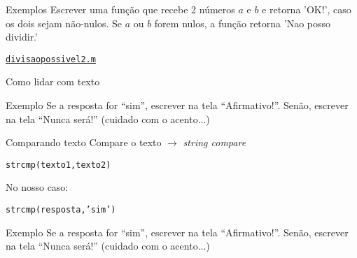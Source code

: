\documentclass[hyperref={pdfpagelabels=false}]{beamer}
\begin{document}
\begin{frame}{Exemplos}
  Escrever uma função que recebe 2 números $a$ e $b$ e retorna 'OK!', caso os dois sejam não-nulos. Se $a$ ou $b$ forem nulos, a função retorna 'Nao posso dividir.'
  \begin{center} \href{listings/divisaopossivel2.m}{\underline{\texttt{divisaopossivel2.m}}} \end{center}
\end{frame}

\begin{frame}{Como lidar com texto}
  
\end{frame}

\begin{frame}{Exemplo}
  Se a resposta for ``sim'', escrever na tela ``Afirmativo!''. Senão, escrever na tela ``Nunca será!'' (cuidado com o acento...)
\end{frame}

\begin{frame}{Comparando texto}
  Compare o texto $\rightarrow$ \emph{\alert{str}ing \alert{c}o\alert{mp}are}
  \begin{center} {\texttt{strcmp(texto1,texto2)}} \end{center}
  No nosso caso:
  \begin{center} {\texttt{strcmp(resposta,'sim')}} \end{center}
\end{frame}

\begin{frame}{Exemplo}
  Se a resposta for ``sim'', escrever na tela ``Afirmativo!''. Senão, escrever na tela ``Nunca será!'' (cuidado com o acento...)
	
\end{frame}
\end{document}
